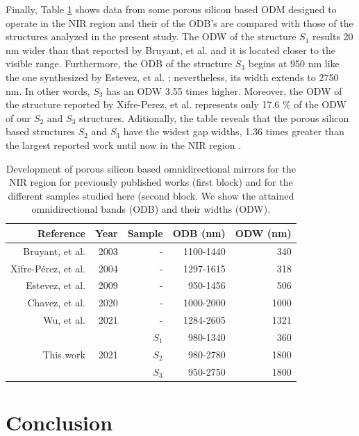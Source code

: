 \documentclass[a4paper,fleqn]{cas-sc}
\begin{document}
	Finally, Table \ref{tab:table3} shows data from some porous
	silicon based ODM designed to operate in the NIR
	region and their of the ODB's are compared with those of
	the structures analyzed in the present study. The ODW
	of the structure $S_1$ results 20 nm wider than that reported by Bruyant,
	et al. \cite{Bruyant2003} and it is located closer to the visible range. Furthermore,
	the ODB of the structure $S_3$ begins at 950 nm like the one
	synthesized by Estevez, et al. \cite{Estevez2009}; nevertheless, its width extends to 2750
	nm. In other words, $S_3$ has an ODW 3.55 times higher. Moreover, the
	ODW of the structure reported by Xifre-Perez, et al. \cite{Xifre2005} represents only 17.6
	\% of the ODW of our $S_2$ and $S_3$ structures. Aditionally, the table
	reveals that the porous silicon based
	structures $S_2$ and $S_3$ have the widest gap widths, 1.36 times greater than the
	largest reported work until now in the NIR region \cite{Wu2021}.
	
	\begin{table}
		\centering
		\label{tab:table3}
		\begin{tabular}{rrrrr}
			Reference&Year&Sample&ODB (nm)&ODW (nm)\\
			\hline
			\hline
			Bruyant, et al. \cite{Bruyant2003}      &2003&-    &1100-1440&340\\
			Xifre-P\'{e}rez, et al. \cite{Xifre2005}&2004&-    &1297-1615&318\\
			Estevez, et al. \cite{Estevez2009}      &2009&-    &950-1456 &506\\
			Chavez, et al. \cite{Chavez2020}        &2020&-    &1000-2000&1000\\
			Wu, et al. \cite{Wu2021}                &2021&-    &1284-2605&1321\\
			\hline
			&    &$S_1$&980-1340&360 \\
			This work                               &2021&$S_2$&980-2780&1800\\
			&    &$S_3$&950-2750&1800\\
		\end{tabular}
		\caption{Development of porous silicon based omnidirectional mirrors for the NIR region for
			previously published works (first block) and for the different samples studied here (second
			block. We show the attained omnidirectional bands (ODB) and their widths (ODW).}
	\end{table}
	
	
	\section{Conclusion}\label{s:conc}
	
\end{document}
